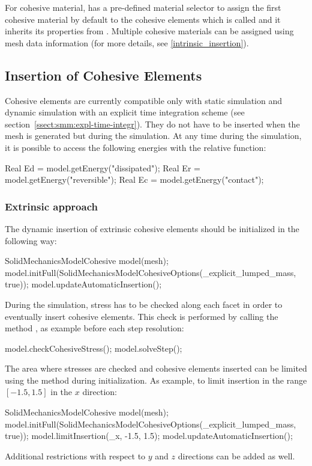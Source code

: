 For cohesive material, \akantu has a pre-defined material selector to assign 
the first cohesive material by default to the cohesive elements which is called 
 and it inherits its properties from 
. Multiple cohesive materials can be assigned 
using mesh data information (for more details, see \ref{intrinsic_insertion}).

\subsection{Insertion of Cohesive Elements}
Cohesive elements are currently compatible only with static simulation
and dynamic simulation with an explicit time integration scheme (see
section~\ref{ssect:smm:expl-time-integr}). They do not have to be
inserted when the mesh is generated but during the simulation. At any
time during the simulation, it is possible to access the following
energies with the relative function:
\begin{cpp}
  Real Ed = model.getEnergy("dissipated");
  Real Er = model.getEnergy("reversible");
  Real Ec = model.getEnergy("contact");
\end{cpp}

\subsubsection{Extrinsic approach}
The dynamic insertion of extrinsic cohesive elements should be initialized 
in the following way:
\begin{cpp}
  SolidMechanicsModelCohesive model(mesh);
  model.initFull(SolidMechanicsModelCohesiveOptions(_explicit_lumped_mass, true));
  model.updateAutomaticInsertion();
\end{cpp} 
During the simulation, stress has to be checked along each facet in order to 
eventually insert cohesive elements.
This check is performed by calling the method , as 
example before each step resolution:
\begin{cpp}
  model.checkCohesiveStress();
  model.solveStep();
\end{cpp}
The area where stresses are checked and cohesive elements inserted can be limited 
using the method  during initialization. As example, to 
limit insertion in the range $[-1.5, 1.5]$ in the $x$ direction: 
\begin{cpp}
  SolidMechanicsModelCohesive model(mesh);
  model.initFull(SolidMechanicsModelCohesiveOptions(_explicit_lumped_mass, true));
  model.limitInsertion(_x, -1.5, 1.5);
  model.updateAutomaticInsertion();
\end{cpp} 
Additional restrictions with respect to $y$ and $z$ directions can be added as well.

